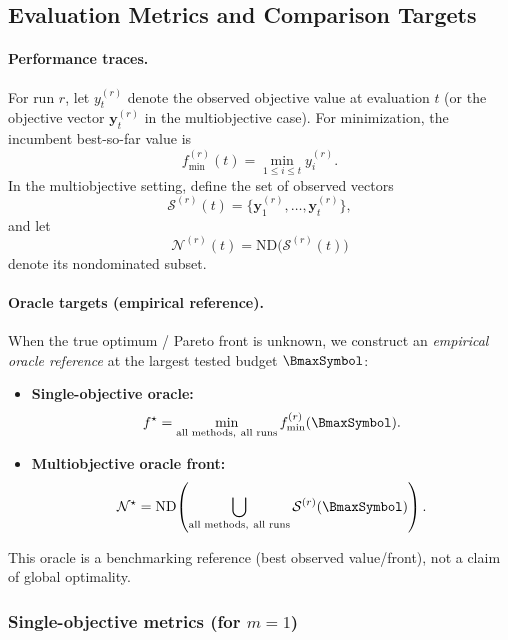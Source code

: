 \subsection{Evaluation Metrics and Comparison Targets}
\label{subsec:metrics}

\paragraph{Performance traces.}
For run \(r\), let \(y_t^{(r)}\) denote the observed objective value at evaluation \(t\)
(or the objective vector \(\mathbf{y}_t^{(r)}\) in the multiobjective case).
For minimization, the incumbent best-so-far value is
\begin{equation}
    f_{\min}^{(r)}(t) = \min_{1 \le i \le t} y_i^{(r)}.
\end{equation}
In the multiobjective setting, define the set of observed vectors
\[
    \mathcal{S}^{(r)}(t) = \{\mathbf{y}_1^{(r)},\dots,\mathbf{y}_t^{(r)}\},
\]
and let
\[
    \mathcal{N}^{(r)}(t) = \mathrm{ND}\!\big(\mathcal{S}^{(r)}(t)\big)
\]
denote its nondominated subset.

\paragraph{Oracle targets (empirical reference).}
When the true optimum / Pareto front is unknown, we construct an \emph{empirical oracle reference} at the largest tested budget \(\BmaxSymbol\):
\begin{itemize}
    \item \textbf{Single-objective oracle:}
    \[
        f^\star = \min_{\text{all methods},\ \text{all runs}} f_{\min}^{(r)}(\BmaxSymbol).
    \]
    \item \textbf{Multiobjective oracle front:}
    \[
        \mathcal{N}^\star =
        \mathrm{ND}\!\left(
        \bigcup_{\text{all methods},\ \text{all runs}} \mathcal{S}^{(r)}(\BmaxSymbol)
        \right).
    \]
\end{itemize}
This oracle is a benchmarking reference (best observed value/front), not a claim of global optimality.

\subsubsection{Single-objective metrics (for \(m=1\))}

